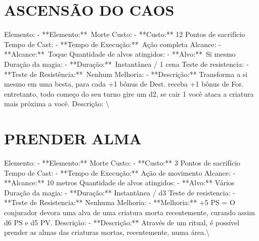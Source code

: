 \documentclass{article}%
\begin{document}
\section{ASCENSÃO DO CAOS}%
\label{sec:ASCENSODOCAOS}%
Elemento: {-} **Elemento:**~Morte\newline%
Custo: {-} **Custo:** 12 Pontos de sacrifício\newline%
Tempo de Cast: {-} **Tempo de Execução:**~Ação completa\newline%
Alcance: {-} **Alcance:**~Toque\newline%
Quantidade de alvos atingidos: {-} **Alvo:**~Si mesmo\newline%
Duração da magia: {-} **Duração:**~Instantânea / 1 cena\newline%
Teste de resistencia: {-} **Teste de Resistência:**~Nenhum\newline%
Melhoria: {-} **Descrição:** Transforma a si mesmo em uma besta, para cada +1 bônus de Dest. receba +1 bônus de For. entretanto, todo começo do seu turno gire um d2, se cair 1 você ataca a criatura mais próxima a você.\newline%
Descrição: \textbackslash{}

%
\section{PRENDER ALMA}%
\label{sec:PRENDERALMA}%
Elemento: {-} **Elemento:** Morte\newline%
Custo: {-} **Custo:** 3 Pontos de sacrifício\newline%
Tempo de Cast: {-} **Tempo de Execução:** Ação de movimento\newline%
Alcance: {-} **Alcance:** 10 metros\newline%
Quantidade de alvos atingidos: {-} **Alvo:** Vários\newline%
Duração da magia: {-} **Duração:** Instantânea / d3\newline%
Teste de resistencia: {-} **Teste de Resistencia:** Nenhuma\newline%
Melhoria: {-} **Melhoria:** +5 PS = O conjurador devora uma alva de uma criatura morta recentemente, curando assim d6 PS e d5 PV.\newline%
Descrição: {-} **Descrição:** Através de um ritual, é possível prender as almas das criaturas mortas, recentemente, numa área.\textbackslash{}

%
\end{document}
